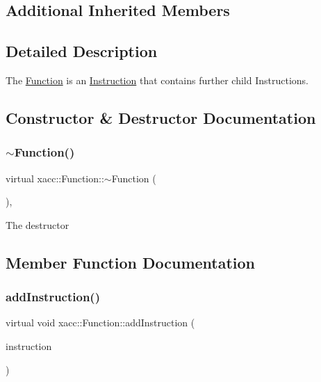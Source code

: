 \subsection*{Additional Inherited Members}


\subsection{Detailed Description}
The \hyperlink{a02456}{Function} is an \hyperlink{a02460}{Instruction} that contains further child Instructions. 

\subsection{Constructor \& Destructor Documentation}
\mbox{\label{a02456_a04b25ba4da1ddfa4ec4ec6d6ffb25bc3}} 
\subsubsection{\texorpdfstring{$\sim$\+Function()}{~Function()}}
{\footnotesize\ttfamily virtual xacc\+::\+Function\+::$\sim$\+Function (\begin{DoxyParamCaption}{ }\end{DoxyParamCaption})\hspace{0.3cm}{\ttfamily [inline]}, {\ttfamily [virtual]}}

The destructor 

\subsection{Member Function Documentation}
\mbox{\label{a02456_aa8c9ec2d08be75c69399d4254b0216f5}} 
\subsubsection{\texorpdfstring{add\+Instruction()}{addInstruction()}}
{\footnotesize\ttfamily virtual void xacc\+::\+Function\+::add\+Instruction (\begin{DoxyParamCaption}\item[{Inst\+Ptr}]{instruction }\end{DoxyParamCaption})\hspace{0.3cm}{\ttfamily [pure virtual]}}

